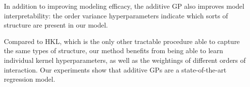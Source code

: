 In addition to improving modeling efficacy, the additive GP also improves model interpretability:  the order variance hyperparameters indicate which sorts of structure are present in our model.

Compared to HKL, which is the only other tractable procedure able to capture the same types of structure, our method benefits from being able to learn individual kernel hyperparameters, as well as the weightings of different orders of interaction.  Our experiments show that additive GPs are a state-of-the-art regression model.



\outbpdocument{


}







%
%





 
 

